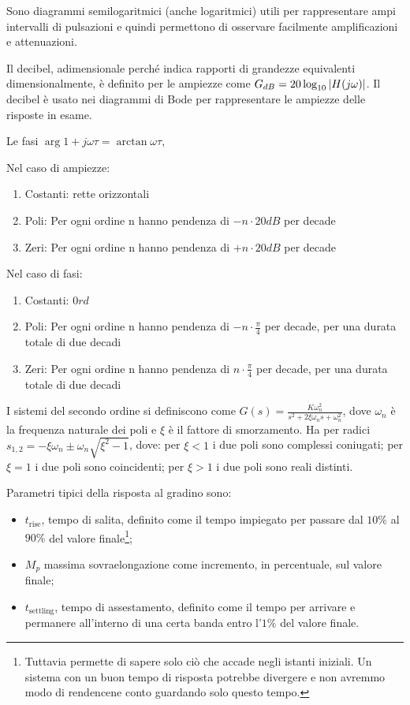 Sono diagrammi semilogaritmici (anche logaritmici) utili per rappresentare ampi intervalli di pulsazioni e quindi permettono di osservare facilmente amplificazioni e attenuazioni.

Il decibel, adimensionale perché indica rapporti di grandezze equivalenti dimensionalmente, è definito per le ampiezze come $G_{dB} = 20\log_{10}{\left|H(j\omega)\right|}$. Il decibel è usato nei diagrammi di Bode per rappresentare le ampiezze delle risposte in esame.

Le fasi $\arg{1+j\omega \tau}=\arctan{\omega \tau}$, 

Nel caso di ampiezze:
\begin{enumerate}
    \item Costanti: rette orizzontali
    \item Poli: Per ogni ordine n hanno pendenza di $-n\cdot 20dB$ per decade 
    \item Zeri: Per ogni ordine n hanno pendenza di $+n\cdot 20dB$ per decade
\end{enumerate}

Nel caso di fasi:
\begin{enumerate}
    \item Costanti: $0 rd$
    \item Poli: Per ogni ordine n hanno pendenza di $-n\cdot \frac{\pi}{4}$ per decade, per una durata totale di due decadi
    \item Zeri: Per ogni ordine n hanno pendenza di $n\cdot \frac{\pi}{4}$ per decade, per una durata totale di due decadi
\end{enumerate}

 \label{sistemi_ordine_2}
I sistemi del secondo ordine si definiscono come \(G(s)=\frac{K \omega_n^2}{s^2+2\xi\omega_n s +\omega_n^2}\), dove \(\omega_n\) è la frequenza naturale dei poli e  \(\xi\) è il fattore di smorzamento. Ha per radici 
\(s_{1,2}=-\xi \omega_n \pm \omega_n\sqrt{\xi^2-1}\), dove: per \(\xi < 1\) i due poli sono complessi coniugati; per \(\xi = 1\) i due poli sono coincidenti; per \(\xi > 1\) i due poli sono reali distinti.

Parametri tipici della risposta al gradino sono: 
\begin{itemize}
    \item \(t_\text{rise}\), tempo di salita, definito come il tempo impiegato per passare dal \(10\%\) al \(90\%\) del valore finale\footnote{Tuttavia permette di sapere solo ciò che accade negli istanti iniziali. Un sistema con un buon tempo di risposta potrebbe divergere e non avremmo modo di rendencene conto guardando solo questo tempo.}; \item \(M_p\) massima sovraelongazione come incremento, in percentuale, sul valore finale; 
    \item \(t_\text{settling}\), tempo di assestamento, definito come il tempo per arrivare e permanere all'interno di una certa banda entro l'\(1\%\) del valore finale.
\end{itemize}

